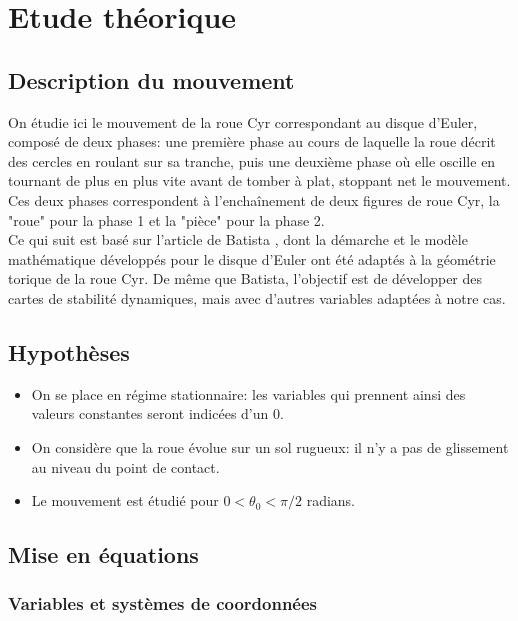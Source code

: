 \label{sec:Theme2}

\section{Etude théorique}
\subsection{Description du mouvement}
On étudie ici le mouvement de la roue Cyr correspondant au disque d'Euler, composé de deux phases: une première phase au cours de laquelle la roue décrit des cercles en roulant sur sa tranche, puis une deuxième phase où elle oscille en tournant de plus en plus vite avant de tomber à plat, stoppant net le mouvement. Ces deux phases correspondent à l'enchaînement de deux figures de roue Cyr, la "roue" pour la phase 1 et la "pièce" pour la phase 2. \\
Ce qui suit est basé sur l'article de Batista \cite{Batista}, dont la démarche et le modèle mathématique développés pour le disque d'Euler ont été adaptés à la géométrie torique de la roue Cyr. De même que Batista, l'objectif est de développer des cartes de stabilité dynamiques, mais avec d'autres variables adaptées à notre cas.

\subsection{Hypothèses}
\begin{itemize}
    \item On se place en régime stationnaire: les variables qui prennent ainsi des valeurs constantes seront indicées d'un 0.
    \item On considère que la roue évolue sur un sol rugueux: il n'y a pas de glissement au niveau du point de contact.
    \item Le mouvement est étudié pour $0<\theta_0<\pi/2$ radians.
\end{itemize}

\subsection{Mise en équations}
\subsubsection{Variables et systèmes de coordonnées}

